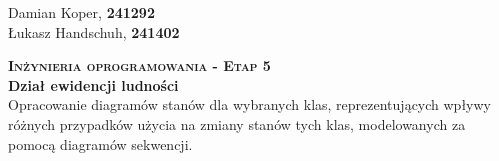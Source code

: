 \documentclass[12pt]{article}
\begin{document}
\begin{flushleft}
    Damian Koper, \textbf{241292} \\
    Łukasz Handschuh, \textbf{241402}
\end{flushleft}
\vspace{1cm}
{
\centering
{\Huge\scshape\bfseries Inżynieria oprogramowania - Etap 5 }\\
\vspace{0.25cm}
\Large\textbf{Dział ewidencji ludności} \\
\vspace{0.25cm}
\large Opracowanie diagramów stanów dla wybranych klas,
reprezentujących wpływy różnych przypadków użycia na
zmiany stanów tych klas, modelowanych za pomocą
diagramów sekwencji.\\
}
\end{document}
